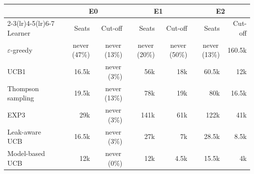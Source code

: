 \begin{tabular}{@{}lrrrrrr@{}}
\toprule
 & \multicolumn{2}{c}{E0} & \multicolumn{2}{c}{E1} & \multicolumn{2}{c}{E2} \\
\cmidrule(lr){2-3}\cmidrule(lr){4-5}\cmidrule(lr){6-7}
Learner & Seats & Cut-off & Seats & Cut-off & Seats & Cut-off \\
\midrule
$\varepsilon$-greedy & never\,(47\%) & never\,(13\%) & never\,(20\%) & never\,(50\%) & never\,(13\%) & 160.5k \\
UCB1 & 16.5k & never\,(3\%) & 56k & 18k & 60.5k & 12k \\
Thompson sampling & 19.5k & never\,(13\%) & 78k & 19k & 80k & 16.5k \\
EXP3 & 29k & never\,(3\%) & 141k & 61k & 122k & 41k \\
Leak-aware UCB & 16.5k & never\,(3\%) & 27k & 7k & 28.5k & 8.5k \\
Model-based UCB & 12k & never\,(0\%) & 12k & 4.5k & 15.5k & 4k \\
\bottomrule
\end{tabular}
